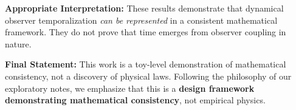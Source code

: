 \documentclass[12pt,a4paper]{article}
\begin{document}
\textbf{Appropriate Interpretation:} These results demonstrate that 
dynamical observer temporalization \textit{can be represented} in a 
consistent mathematical framework. They do not prove that time emerges 
from observer coupling in nature.

\textbf{Final Statement:} This work is a toy-level demonstration of 
mathematical consistency, not a discovery of physical laws. Following 
the philosophy of our exploratory notes, we emphasize that this is a 
\textbf{design framework demonstrating mathematical consistency}, 
not empirical physics.



\end{document}
